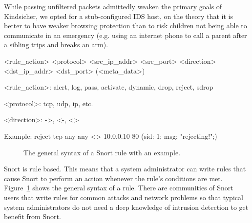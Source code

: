 While passing unfiltered packets admittedly weaken the primary goals of
Kindsicher, we opted for a stub-configured IDS host, on the theory that it is
better to have weaker browsing protection than to risk children not being able
to communicate in an emergency (e.g. using an internet phone to call a parent
after a sibling trips and breaks an arm).




\begin{verbbox}
<rule_action> <protocol>
    <src_ip_addr> <src_port>
    <direction>
    <dst_ip_addr> <dst_port>
    (<meta_data>)


<rule_action>: alert, log, pass, activate,
    dynamic, drop, reject, sdrop

<protocol>: tcp, udp, ip, etc.

<direction>: ->, <-, <>

Example:
reject tcp
    any any
    <>
    10.0.0.10 80
    (sid: 1; msg: "rejecting!";)

\end{verbbox}

\begin{figure}[!t]
    \centering
    \theverbbox
    \caption{The general syntax of a Snort rule with an example.}
    \label{fig:rule_syntax}
\end{figure}

Snort is rule based. 
%
This means that a system administrator can write rules that cause Snort to
perform an action whenever the rule's conditions are met.  
%
Figure~\ref{fig:rule_syntax} shows the general syntax of a rule. There are
communities of Snort users that write rules for common attacks and network
problems so that typical system administrators do not need a deep knowledge of
intrusion detection to get benefit from Snort.

